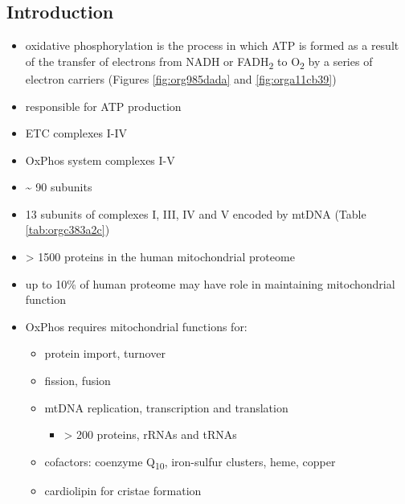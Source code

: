 \documentclass[12pt]{scrartcl}
\begin{document}
\subsection{Introduction}
\label{sec:org0a9c6e4}
\begin{itemize}
\item oxidative phosphorylation is the process in which ATP is formed as a
result of the transfer of electrons from NADH or FADH\textsubscript{2} to O\textsubscript{2} by a
series of electron carriers (Figures \ref{fig:org985dada} and \ref{fig:orga11cb39})
\item responsible for ATP production
\item ETC complexes I-IV
\item OxPhos system complexes I-V
\item \textasciitilde{} 90 subunits
\item 13 subunits of complexes I, III, IV and V encoded by mtDNA (Table \ref{tab:orgc383a2c})
\item \textgreater{} 1500 proteins in the human mitochondrial proteome
\item up to 10\% of human proteome may have role in maintaining mitochondrial function
\item OxPhos requires mitochondrial functions for:
\begin{itemize}
\item protein import, turnover
\item fission, fusion
\item mtDNA replication, transcription and translation
\begin{itemize}
\item \textgreater{} 200 proteins, rRNAs and tRNAs
\end{itemize}
\item cofactors: coenzyme Q\textsubscript{10}, iron-sulfur clusters, heme, copper
\item cardiolipin for cristae formation
\end{itemize}


\end{itemize}
\end{document}
